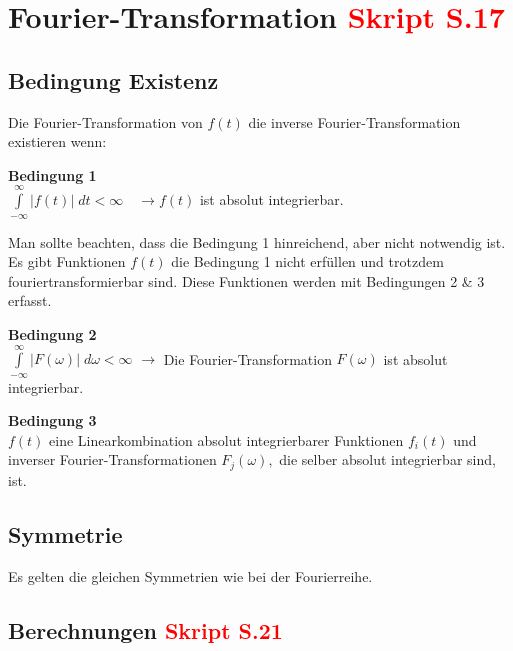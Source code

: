 
\section{Fourier-Transformation \small{\textcolor{red}{Skript S.17}}}%

	\subsection{Bedingung Existenz}%
		\vspace{-3mm}	%
		Die Fourier-Transformation von $f(t)$
		die inverse Fourier-Transformation existieren  wenn:
		
		\textbf{Bedingung 1}\\
			$\int\limits_{-\infty}^{\infty}|f(t)| \; d t<\infty \quad \rightarrow f(t)$ ist absolut integrierbar.
			
		Man sollte beachten, dass die Bedingung 1 hinreichend, aber nicht notwendig ist. Es gibt Funktionen $f(t)$ die Bedingung 1 nicht erfüllen und trotzdem fouriertransformierbar sind. Diese Funktionen werden mit Bedingungen 2 \& 3 erfasst. 
		
		\textbf{Bedingung 2}\\
			$\int\limits_{-\infty}^{\infty}|F(\omega)| \; d \omega<\infty$ \quad
			$\rightarrow$ Die Fourier-Transformation $F( \omega)$ ist absolut integrierbar.
			
		\textbf{Bedingung 3}\\
			$f(t)$ eine Linearkombination absolut integrierbarer Funktionen
			$f_{i}(t)$ und inverser Fourier-Transformationen $F_{j}(\omega),$ die selber
			absolut integrierbar sind, ist.
			
	\subsection{Symmetrie }%
		\vspace{-3mm}	%
		Es gelten die gleichen Symmetrien wie bei der Fourierreihe.


	\subsection{Berechnungen \small{\textcolor{red}{Skript S.21}}}%
  
